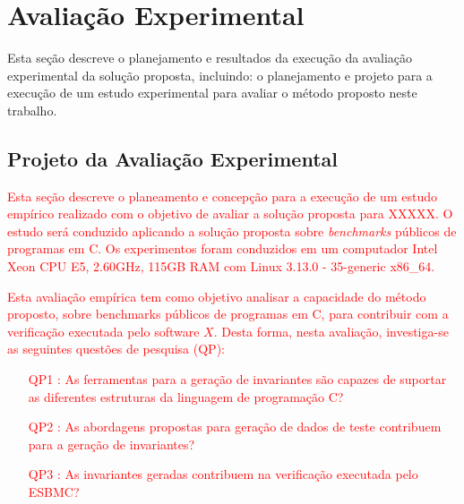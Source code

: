 \section{Avaliação Experimental}
\label{sec:plan-experimentos}



Esta seção descreve o planejamento e resultados da execução da avaliação experimental da solução proposta, incluindo: o planejamento e projeto para a execução de um estudo experimental para avaliar o método proposto 
neste trabalho.


\subsection{Projeto da Avaliação Experimental}
\label{sub:experimento}


\textcolor{red}{Esta seção descreve o planeamento e concepção para a execução de um estudo empírico realizado com o objetivo de avaliar a solução proposta para \textcolor{red}{XXXXX}. O estudo será conduzido aplicando a solução proposta sobre \textit{benchmarks} públicos de programas em C. Os experimentos foram conduzidos em um computador Intel Xeon CPU E5, 2.60GHz, 115GB RAM com Linux 3.13.0 - 35-generic x86\_64.}


\textcolor{red}{Esta avaliação empírica tem como objetivo analisar a capacidade do método proposto, sobre benchmarks públicos de programas em C, para contribuir com a verificação executada pelo software $X$. Desta forma, nesta avaliação, investiga-se as seguintes questões de pesquisa (QP):
%
\begin{itemize}
    \item[QP1]: As ferramentas para a geração de invariantes são capazes de suportar as diferentes estruturas da linguagem de programação C?
    \item[QP2]: As abordagens propostas para geração de dados de teste contribuem para a geração de invariantes?
    \item[QP3]: As invariantes geradas contribuem na verificação executada pelo ESBMC?
\end{itemize}}


